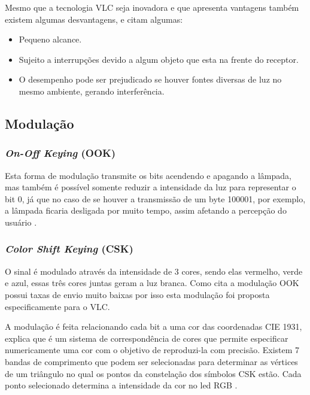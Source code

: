Mesmo que a tecnologia VLC seja inovadora e que apresenta vantagens também existem algumas desvantagens,  e  citam algumas:

\begin{itemize}
  \item Pequeno alcance.
  \item Sujeito a interrupções devido a algum objeto que esta na frente do receptor.
  \item O desempenho pode ser prejudicado se houver fontes diversas de luz no mesmo ambiente, gerando interferência.
\end{itemize}

\subsection{Modulação}

\subsubsection{\textit{On-Off Keying} (OOK)} \label{subsec:ook}

Esta forma de modulação transmite os bits acendendo e apagando a lâmpada, mas também é possível somente reduzir a intensidade da luz para representar o bit 0, já que no caso de se houver a transmissão de um byte 100001, por exemplo, a lâmpada ficaria desligada por muito tempo, assim afetando a percepção do usuário \cite{matheus2017comunicaccao}.

\subsubsection{\textit{Color Shift Keying} (CSK)}

O sinal é modulado através da intensidade de 3 cores, sendo elas vermelho, verde e azul, essas três cores juntas geram a luz branca. Como cita  a modulação OOK possui taxas de envio muito baixas por isso esta modulação foi proposta especificamente para o VLC. 

A modulação é feita relacionando cada bit a uma cor das coordenadas CIE 1931,  explica que é um sistema de correspondência de cores que permite especificar numericamente uma cor com o objetivo de reproduzi-la com precisão. Existem 7 bandas de comprimento que podem ser selecionadas para determinar as vértices de um triângulo no qual os pontos da constelação dos símbolos CSK estão. Cada ponto selecionado determina a intensidade da cor no led RGB \cite{matheus2017comunicaccao}. \newline

